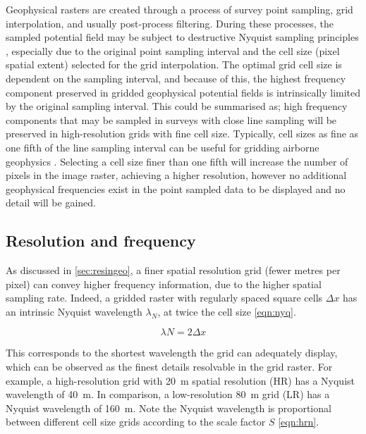 \documentclass[manuscript.tex]{subfiles}
\begin{document}
Geophysical rasters are created through a process of survey point sampling, grid interpolation, and usually post-process filtering.
During these processes, the sampled potential field may be subject to destructive Nyquist sampling principles \parencite[16]{dentithGeophysicsMineralExploration2014}, especially due to the original point sampling interval and the cell size (pixel spatial extent) selected for the grid interpolation.
The optimal grid cell size is dependent on the sampling interval, and because of this, the highest frequency component preserved in gridded geophysical potential fields is intrinsically limited by the original sampling interval.
This could be summarised as; high frequency components that may be sampled in surveys with close line sampling will be preserved in high-resolution grids with fine cell size.
Typically, cell sizes as fine as one fifth of the line sampling interval can be useful for gridding airborne geophysics \parencite{reidAeromagneticSurveyDesign1980}.
Selecting a cell size finer than one fifth will increase the number of pixels in the image raster, achieving a higher resolution, however no additional geophysical frequencies exist in the point sampled data to be displayed and no detail will be gained.

\subsection{Resolution and frequency}
As discussed in \cref{sec:resingeo}, a finer spatial resolution grid (fewer metres per pixel) can convey higher frequency information, due to the higher spatial sampling rate.
Indeed, a gridded raster with regularly spaced square cells \(\Delta x\) has an intrinsic Nyquist wavelength \(\lambda _N\), at twice the cell size \cref{eqn:nyq}.

\begin{equation}
    \label{eqn:nyq}
    \lambda{}N = 2 \Delta{}x
\end{equation}

This corresponds to the shortest wavelength the grid can adequately display, which can be observed as the finest details resolvable in the grid raster.
For example, a high-resolution grid with \SI{20}{\metre} spatial resolution (HR) has a Nyquist wavelength of \SI{40}{\metre}.
In comparison, a low-resolution \SI{80}{\metre} grid (LR) has a Nyquist wavelength of \SI{160}{\metre}.
Note the Nyquist wavelength is proportional between different cell size grids according to the scale factor \(S\) \cref{eqn:hrn}.
\end{document}
